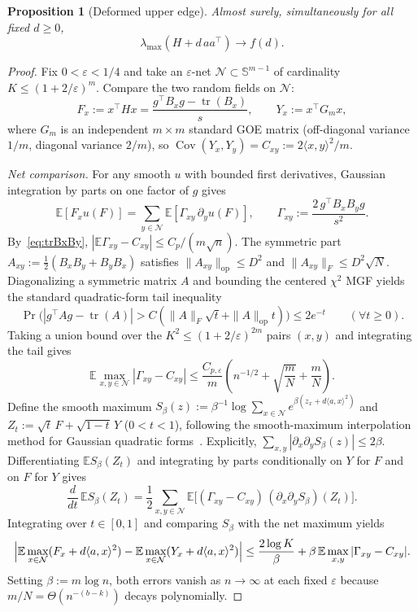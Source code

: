 \documentclass[11pt]{article}
\theoremstyle{plain}
\newtheorem{proposition}[theorem]{Proposition}
\theoremstyle{definition}
\theoremstyle{remark}
\DeclareMathOperator{\tr}{tr}
\DeclareMathOperator{\Cov}{Cov}
\begin{document}
\begin{proposition}[Deformed upper edge]\label{prop:edge}
Almost surely, simultaneously for all fixed $d \ge 0$,
\begin{equation}\label{eq:edge}
\lambda_{\max}(H + d\,a a^\top) \longrightarrow f(d).
\end{equation}
\end{proposition}

\begin{proof}
Fix $0 < \varepsilon < 1/4$ and take an $\varepsilon$-net $\mathcal{N} \subset \mathbb{S}^{m-1}$ of cardinality $K \le (1 + 2/\varepsilon)^m$. Compare the two random fields on $\mathcal{N}$:
\[
F_x := x^\top H x = \frac{g^\top B_x g - \tr(B_x)}{s}, \qquad
Y_x := x^\top G_m x,
\]
where $G_m$ is an independent $m \times m$ standard GOE matrix (off-diagonal variance $1/m$, diagonal variance $2/m$), so $\Cov(Y_x, Y_y) = C_{xy} := 2\langle x, y \rangle^2 / m$.

\emph{Net comparison.} For any smooth $u$ with bounded first derivatives, Gaussian integration by parts on one factor of $g$ gives
\[
\mathbb{E}[F_x u(F)] = \sum_{y \in \mathcal{N}} \mathbb{E}[\Gamma_{xy}\,\partial_y u(F)],
\qquad
\Gamma_{xy} := \frac{2\, g^\top B_x B_y g}{s^2}.
\]
By~\eqref{eq:trBxBy}, $|\mathbb{E}\Gamma_{xy} - C_{xy}| \le C_p / (m\sqrt{n})$. The symmetric part $A_{xy} := \frac{1}{2}(B_x B_y + B_y B_x)$ satisfies $\|A_{xy}\|_{\mathrm{op}} \le D^2$ and $\|A_{xy}\|_F \le D^2 \sqrt{N}$. Diagonalizing a symmetric matrix $A$ and bounding the centered $\chi^2$ MGF yields the standard quadratic-form tail inequality
\[
\Pr\bigl(|g^\top A g - \tr(A)| > C(\|A\|_F \sqrt{t} + \|A\|_{\mathrm{op}} t)\bigr) \le 2e^{-t} \qquad (\forall t \ge 0).
\]
Taking a union bound over the $K^2 \le (1 + 2/\varepsilon)^{2m}$ pairs $(x, y)$ and integrating the tail gives
\begin{equation}\label{eq:Gamma-err}
\mathbb{E}\max_{x, y \in \mathcal{N}} |\Gamma_{xy} - C_{xy}|
\le \frac{C_{p,\varepsilon}}{m}\left(n^{-1/2} + \sqrt{\frac{m}{N}} + \frac{m}{N}\right).
\end{equation}
Define the smooth maximum $S_\beta(z) := \beta^{-1}\log\sum_{x \in \mathcal{N}} e^{\beta(z_x + d\langle a, x \rangle^2)}$ and $Z_t := \sqrt{t}\,F + \sqrt{1-t}\,Y$ ($0 < t < 1$), following the smooth-maximum interpolation method for Gaussian quadratic forms~\cite{Koike2021}. Explicitly, $\sum_{x,y} |\partial_x \partial_y S_\beta(z)| \le 2\beta$. Differentiating $\mathbb{E} S_\beta(Z_t)$ and integrating by parts conditionally on $Y$ for $F$ and on $F$ for $Y$ gives
\[
\frac{d}{dt}\,\mathbb{E} S_\beta(Z_t)
= \frac{1}{2}\sum_{x, y \in \mathcal{N}} \mathbb{E}\bigl[(\Gamma_{xy} - C_{xy})\,(\partial_x \partial_y S_\beta)(Z_t)\bigr].
\]
Integrating over $t \in [0, 1]$ and comparing $S_\beta$ with the net maximum yields
\[
\Bigl|\mathbb{E}\max_{x \in \mathcal{N}}(F_x + d\langle a, x \rangle^2) - \mathbb{E}\max_{x \in \mathcal{N}}(Y_x + d\langle a, x \rangle^2)\Bigr|
\le \frac{2\log K}{\beta} + \beta\,\mathbb{E}\max_{x,y}|\Gamma_{xy} - C_{xy}|.
\]
Setting $\beta := m\log n$, both errors vanish as $n \to \infty$ at each fixed $\varepsilon$ because $m/N = \Theta(n^{-(b-k)})$ decays polynomially.


\end{proof}
\end{document}
